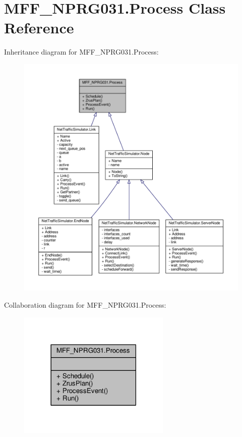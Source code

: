 \hypertarget{classMFF__NPRG031_1_1Process}{\section{M\-F\-F\-\_\-\-N\-P\-R\-G031.\-Process Class Reference}
\label{classMFF__NPRG031_1_1Process}
}


Inheritance diagram for M\-F\-F\-\_\-\-N\-P\-R\-G031.\-Process\-:\nopagebreak
\begin{figure}[H]
\begin{center}
\leavevmode
\includegraphics[width=350pt]{classMFF__NPRG031_1_1Process__inherit__graph}
\end{center}
\end{figure}


Collaboration diagram for M\-F\-F\-\_\-\-N\-P\-R\-G031.\-Process\-:\nopagebreak
\begin{figure}[H]
\begin{center}
\leavevmode
\includegraphics[width=206pt]{classMFF__NPRG031_1_1Process__coll__graph}
\end{center}
\end{figure}
